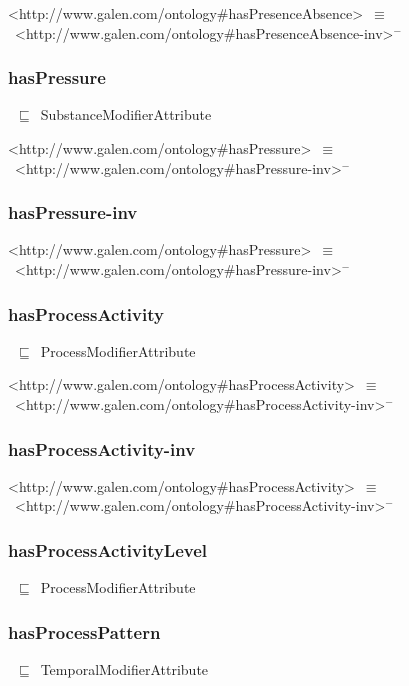 \documentclass{article}
\begin{document}
<http://www.galen.com/ontology#hasPresenceAbsence>~\ensuremath{\equiv}~<http://www.galen.com/ontology#hasPresenceAbsence-inv>\ensuremath{^-}

\subsubsection*{hasPressure}

~\ensuremath{\sqsubseteq}~SubstanceModifierAttribute

<http://www.galen.com/ontology#hasPressure>~\ensuremath{\equiv}~<http://www.galen.com/ontology#hasPressure-inv>\ensuremath{^-}

\subsubsection*{hasPressure-inv}

<http://www.galen.com/ontology#hasPressure>~\ensuremath{\equiv}~<http://www.galen.com/ontology#hasPressure-inv>\ensuremath{^-}

\subsubsection*{hasProcessActivity}

~\ensuremath{\sqsubseteq}~ProcessModifierAttribute

<http://www.galen.com/ontology#hasProcessActivity>~\ensuremath{\equiv}~<http://www.galen.com/ontology#hasProcessActivity-inv>\ensuremath{^-}

\subsubsection*{hasProcessActivity-inv}

<http://www.galen.com/ontology#hasProcessActivity>~\ensuremath{\equiv}~<http://www.galen.com/ontology#hasProcessActivity-inv>\ensuremath{^-}

\subsubsection*{hasProcessActivityLevel}

~\ensuremath{\sqsubseteq}~ProcessModifierAttribute

\subsubsection*{hasProcessPattern}

~\ensuremath{\sqsubseteq}~TemporalModifierAttribute
\end{document}
